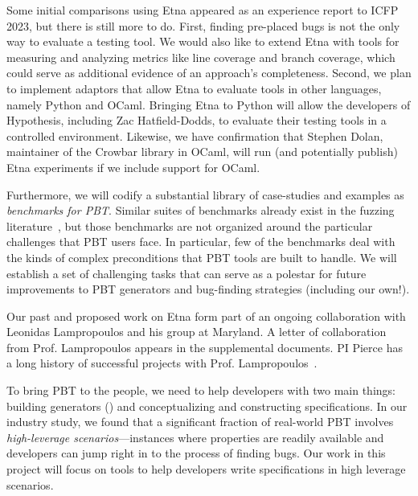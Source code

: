 Some initial comparisons using Etna appeared as an experience report to ICFP
2023, but there is still more to do. First, finding pre-placed bugs is not the
only way to evaluate a testing tool. We would also like to extend Etna with
tools for measuring and analyzing metrics like line coverage and branch
coverage, which could serve as additional evidence of an approach's
completeness. Second, we plan to implement adaptors that allow Etna to evaluate
tools in other languages, namely Python and OCaml. Bringing Etna to Python will
allow the developers of Hypothesis, including Zac Hatfield-Dodds, to evaluate their testing tools in a controlled
environment. Likewise, we have confirmation that Stephen Dolan, maintainer of
the Crowbar library in OCaml, will run (and potentially publish) Etna
experiments if we include support for OCaml.

Furthermore, we will codify a substantial library of case-studies and examples as
{\em benchmarks for PBT}. Similar suites of benchmarks already exist in the
fuzzing literature~\cite{hazimeh_magma_2021}, but those benchmarks are not
organized around the particular challenges that PBT users face. In particular,
few of the benchmarks deal with the kinds of complex preconditions that PBT
tools are built to handle. We will establish a set of challenging tasks that
can serve as a polestar for future improvements to PBT generators and
bug-finding strategies (including our own!).

Our past and proposed work on Etna form part of an ongoing
collaboration with Leonidas Lampropoulos and his group at Maryland.
A letter of collaboration
from Prof.{} Lampropoulos appears in the supplemental documents.
PI Pierce has a long history
of successful projects with Prof.
Lampropoulos~\cite[etc.]{beginners-luck,DBLP:conf/esop/GoldsteinHLP21,lampropoulos_coverage_2019,Lampropoulos&18,OLDlampropoulos19fuzzchick}.


%
To bring PBT to the people, we need to help developers with two main
things: building generators () and conceptualizing and constructing
specifications.
%
In our industry study, we found that a significant fraction of real-world PBT
involves {\em high-leverage scenarios}---instances where properties are
readily available and developers can jump right in to the process of finding
bugs.
%
Our work in this project will focus on tools to help developers write
specifications in high leverage scenarios.

